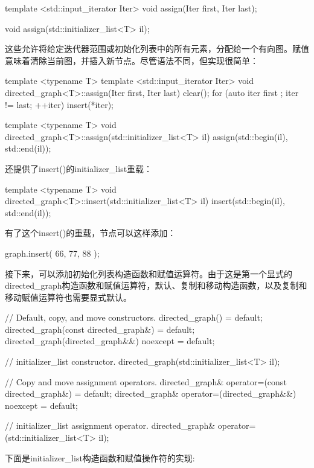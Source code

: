 \begin{cpp}
template <std::input_iterator Iter>
void assign(Iter first, Iter last);

void assign(std::initializer_list<T> il);
\end{cpp}

这些允许将给定迭代器范围或初始化列表中的所有元素，分配给一个有向图。赋值意味着清除当前图，并插入新节点。尽管语法不同，但实现很简单：

\begin{cpp}
template <typename T>
template <std::input_iterator Iter>
void directed_graph<T>::assign(Iter first, Iter last)
{
    clear();
    for (auto iter { first }; iter != last; ++iter) { insert(*iter); }
}

template <typename T>
void directed_graph<T>::assign(std::initializer_list<T> il)
{
    assign(std::begin(il), std::end(il));
}
\end{cpp}

还提供了insert()的initializer\_list重载：

\begin{cpp}
template <typename T>
void directed_graph<T>::insert(std::initializer_list<T> il)
{
    insert(std::begin(il), std::end(il));
}
\end{cpp}

有了这个insert()的重载，节点可以这样添加：

\begin{cpp}
graph.insert({ 66, 77, 88 });
\end{cpp}

接下来，可以添加初始化列表构造函数和赋值运算符。由于这是第一个显式的directed\_graph构造函数和赋值运算符，默认、复制和移动构造函数，以及复制和移动赋值运算符也需要显式默认。

\begin{cpp}
// Default, copy, and move constructors.
directed_graph() = default;
directed_graph(const directed_graph&) = default;
directed_graph(directed_graph&&) noexcept = default;

// initializer_list constructor.
directed_graph(std::initializer_list<T> il);

// Copy and move assignment operators.
directed_graph& operator=(const directed_graph&) = default;
directed_graph& operator=(directed_graph&&) noexcept = default;

// initializer_list assignment operator.
directed_graph& operator=(std::initializer_list<T> il);
\end{cpp}

下面是initializer\_list构造函数和赋值操作符的实现:

